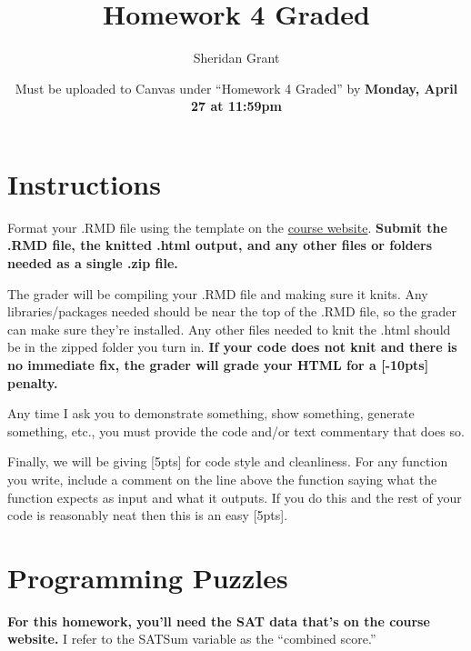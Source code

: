 \documentclass[12pt]{article}
\title{Homework 4 Graded}
\author{Sheridan Grant}
\date{Must be uploaded to Canvas under ``Homework 4 Graded'' by \textbf{Monday, April 27 at 11:59pm}}
\begin{document}
\sloppy

\maketitle

\section*{Instructions}

Format your .RMD file using the template on the \href{https://sheridanlgrant.github.io/teaching/STAT302_SPR2020}{course website}. \textbf{Submit the .RMD file, the knitted .html output, and any other files or folders needed as a single .zip file.}

The grader will be compiling your .RMD file and making sure it knits. Any libraries/packages needed should be near the top of the .RMD file, so the grader can make sure they're installed. Any other files needed to knit the .html should be in the zipped folder you turn in. \textbf{If your code does not knit and there is no immediate fix, the grader will grade your HTML for a [-10pts] penalty.}

Any time I ask you to demonstrate something, show something, generate something, etc., you must provide the code and/or text commentary that does so.

Finally, we will be giving [5pts] for code style and cleanliness. For any function you write, include a comment on the line above the function saying what the function expects as input and what it outputs. If you do this and the rest of your code is reasonably neat then this is an easy [5pts].

\section{Programming Puzzles}

\textbf{For this homework, you'll need the SAT data that's on the course website.} I refer to the SATSum variable as the ``combined score.''
\end{document}
